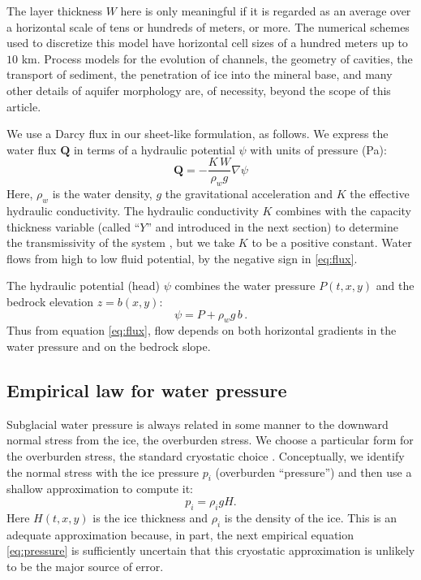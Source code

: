 \documentclass[11pt]{amsart}
\newcommand{\bQ}{\mathbf{Q}}
\begin{document}
The layer thickness $W$ here is only meaningful if it is regarded as an average over a horizontal scale of tens or hundreds of meters, or more.  The numerical schemes used to discretize this model have horizontal cell sizes of a hundred meters up to $10$ km.  Process models for the evolution of channels, the geometry of cavities, the transport of sediment, the penetration of ice into the mineral base, and many other details of aquifer morphology are, of necessity, beyond the scope of this article.

We use a Darcy flux in our sheet-like formulation, as follows.  We express the water flux $\bQ$ in terms of a hydraulic potential $\psi$ \citep{Clarke05, FlowersClarke2002_theory} with units of pressure (Pa):
\begin{equation}
\bQ = - \frac{K \, W}{\rho_w g} \nabla \psi
\label{eq:flux}
\end{equation}
Here, $\rho_w$ is the water density, $g$ the gravitational acceleration and $K$ the effective hydraulic conductivity.  The hydraulic conductivity $K$ combines with the capacity thickness variable (called ``$Y$'' and introduced in the next section) to determine the transmissivity of the system \citep{PimentelFlowersSchoof2010}, but we take $K$ to be a positive constant.  Water flows from high to low fluid potential, by the negative sign in \eqref{eq:flux}.

The hydraulic potential (head) $\psi$ combines the water pressure $P(t,x,y)$ and the bedrock elevation $z=b(x,y)$:
\begin{equation} \label{eq:potential}
\psi = P + \rho_w g\, b \, .
\end{equation}
Thus from equation \eqref{eq:flux}, flow depends on both horizontal gradients in the water pressure and on the bedrock slope.

\subsection*{Empirical law for water pressure}  Subglacial water pressure is always related in some manner to the downward normal stress from the ice, the overburden stress.  We choose a particular form for the overburden stress, the standard cryostatic choice \citep{Clarke05}.  Conceptually, we identify the normal stress with the ice pressure $p_i$ (overburden ``pressure'') and then use a shallow approximation \citep{Fowler} to compute it:
\begin{equation}\label{eq:shallowoverburden}
  p_i = \rho_i g H.
\end{equation}
Here $H(t,x,y)$ is the ice thickness and $\rho_i$ is the density of the ice.   This is an adequate approximation because, in part, the next empirical equation \eqref{eq:pressure} is sufficiently uncertain that this cryostatic approximation is unlikely to be the major source of error.
\end{document}
